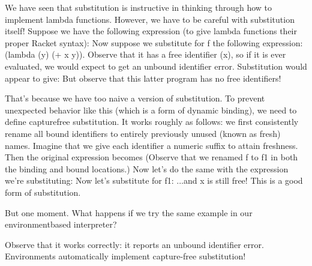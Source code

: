
We have seen that substitution is instructive in thinking through how to
implement lambda functions. However, we have to be careful with substitution
itself! Suppose we have the following expression (to give lambda functions their
proper Racket syntax):
Now suppose we substitute for f the following expression: (lambda (y) (+ x y)).
Observe that it has a free identifier (x), so if it is ever evaluated, we would
expect to get an unbound identifier error. Substitution would appear to give:
But observe that this latter program has no free identifiers!

That’s because we have too naive a version of substitution. To prevent
unexpected behavior like this (which is a form of dynamic binding), we need to
define capturefree substitution. It works roughly as follows: we first
consistently rename all bound identifiers to entirely previously unused (known
as fresh) names. Imagine that we give each identifier a numeric suffix to attain
freshness. Then the original expression becomes
(Observe that we renamed f to f1 in both the binding and bound locations.) Now
let’s do the same with the expression we’re substituting:
Now let’s substitute for f1:
...and x is still free! This is a good form of substitution.

But one moment. What happens if we try the same example in our environmentbased
interpreter?

Observe that it works correctly: it reports an unbound identifier error.
Environments automatically implement capture-free substitution!
